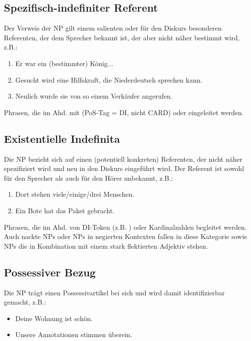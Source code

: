 {\subsection{Spezifisch-indefiniter Referent}

Der Verweis der NP gilt einem salienten oder für den Diskurs besonderen Referenten, der dem Sprecher bekannt ist, der aber nicht näher bestimmt wird, z.B.: 

\begin{enumerate}
\item Er war ein (bestimmter) König...
\item Gesucht wird eine Hilfskraft, die Niederdeutsch sprechen kann.
\item Neulich wurde sie von so einem Verkäufer angerufen.
\end{enumerate}

\noindent 
{} Phrasen, die im Ahd. mit  (PoS-Tag = DI, nicht CARD) oder  eingeleitet werden. 

\subsection{Existentielle Indefinita}

Die NP bezieht sich auf einen (potentiell konkreten) Referenten, der nicht näher spezifiziert wird und neu in den Diskurs eingeführt wird. Der Referent ist sowohl für den Sprecher als auch für den Hörer unbekannt, z.B.:

\begin{enumerate}
\item Dort stehen viele/einige/drei Menschen.
\item Ein Bote hat das Paket gebracht.  
\end{enumerate}

\noindent 
{} Phrasen, die im Ahd. von DI-Token (z.B. ) oder Kardinalzahlen begleitet werden. Auch nackte NPs oder NPs in negierten Kontexten fallen in diese Kategorie sowie NPs die in Kombination mit einem stark flektierten Adjektiv stehen. 

\subsection{Possessiver Bezug}

Die NP trägt einen Possessivartikel bei sich und wird damit identifizierbar gemacht, z.B.:

\begin{itemize}
\item Deine Wohnung ist schön.
\item Unsere Annotationen stimmen überein.
\end{itemize}

}
